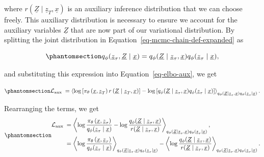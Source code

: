 \documentclass[
]{scrartcl}
\begin{document}
\begin{refsection}
where \(r(\underline{Z} \mid \underline{z}_T, \underline{x})\) is an
auxiliary inference distribution that we can choose freely. This
auxiliary distribution is necessary to ensure we account for the
auxiliary variables \(\underline{Z}\) that are now part of our
variational distribution. By splitting the joint distribution in
Equation~\ref{eq-mcmc-chain-def-expanded} as

\begin{equation}\phantomsection\label{eq-mcmc-chain-def-expanded-2}{
q_\phi(\underline{z}_\tau, \underline{Z} \mid \underline{x}) =
q_\phi(\underline{Z} \mid \underline{z}_\tau, \underline{x}) q_\phi(\underline{z}_\tau \mid \underline{x}),
}\end{equation}

and substituting this expression into Equation~\ref{eq-elbo-aux}, we get

\begin{equation}\phantomsection\label{eq-elbo-aux-2}{
\mathcal{L}_{\text {aux }} =
\left\langle\log 
    \left[
        \pi_\theta\left(\underline{x}, \underline{z}_T\right) 
        r\left(\underline{Z} \mid \underline{z}_T, \underline{x}\right)
    \right] - 
    \log \left[q_\phi(\underline{Z} \mid \underline{z}_\tau, \underline{x}) q_\phi(\underline{z}_\tau \mid \underline{x})\right]
\right\rangle_{q_\phi(\underline{Z} \mid \underline{z}_\tau, \underline{x}) q_\phi(\underline{z}_\tau \mid \underline{x})}.
}\end{equation}

Rearranging the terms, we get
\begin{equation}\phantomsection\label{eq-elbo-aux-3}{
\begin{aligned}
\mathcal{L}_{\text {aux }} 
& = \left\langle 
    \log \frac{\pi_\theta\left(\underline{x}, \underline{z}_\tau\right)}{q_\phi(\underline{z}_\tau \mid \underline{x})} - 
    \log \frac{q_\phi(\underline{Z} \mid \underline{z}_\tau, \underline{x})}{r(\underline{Z} \mid \underline{z}_\tau, \underline{x})}
\right\rangle_{
    q_\phi(\underline{Z} \mid \underline{z}_\tau, \underline{x})
    q_\phi(\underline{z}_\tau \mid \underline{x})
}, \\
& = \left\langle 
    \log \frac{\pi_\theta\left(\underline{x}, \underline{z}_\tau\right)}{q_\phi(\underline{z}_\tau \mid \underline{x})}
\right\rangle_{
    q_\phi(\underline{Z} \mid \underline{z}_\tau, \underline{x})
    q_\phi(\underline{z}_\tau \mid \underline{x})
} - 
\left\langle
    \log \frac{q_\phi(\underline{Z} \mid \underline{z}_\tau, \underline{x})}{r(\underline{Z} \mid \underline{z}_\tau, \underline{x})}
\right\rangle_{
    q_\phi(\underline{Z} \mid \underline{z}_\tau, \underline{x})
    q_\phi(\underline{z}_\tau \mid \underline{x})
}.
\end{aligned}
}\end{equation}


\end{refsection}
\end{document}
